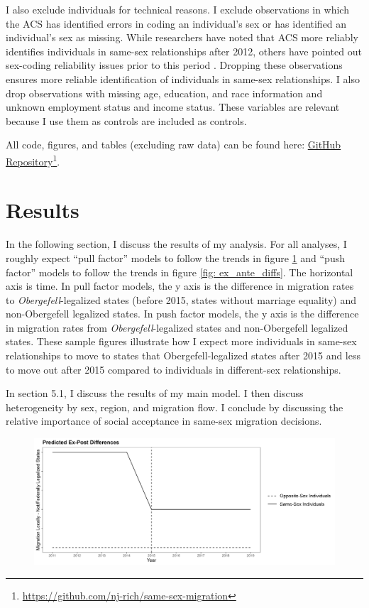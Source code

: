 \documentclass[12pt,letterpaper]{article}
\begin{document}
I also exclude individuals for technical reasons. I exclude observations in which the ACS has identified errors in coding an individual’s sex or has identified an individual’s sex as missing. While researchers have noted that ACS more reliably identifies individuals in same-sex relationships after 2012, others have pointed out sex-coding reliability issues prior to this period \citep{3, 5, 7, 12}. Dropping these observations ensures more reliable identification of individuals in same-sex relationships. I also drop observations with missing age, education, and race information and unknown employment status and income status. These variables are relevant because I use them as controls are included as controls. 

All code, figures, and tables (excluding raw data) can be found here: \href{https://github.com/nj-rich/same-sex-migration}{GitHub Repository}\footnote{\url{https://github.com/nj-rich/same-sex-migration}}.

\FloatBarrier
\section{Results}
In the following section, I discuss the results of my analysis. For all analyses, I roughly expect “pull factor” models to follow the trends in figure \ref{fig: ex_post_diffs} and “push factor” models to follow the trends in figure \ref{fig: ex_ante_diffs}. The horizontal axis is time. In pull factor models, the y axis is the difference in migration rates to \textit{Obergefell}-legalized states (before 2015, states without marriage equality) and non-Obergefell legalized states. In push factor models, the y axis is the difference in migration rates from \textit{Obergefell}-legalized states and non-Obergefell legalized states. These sample figures illustrate how I expect more individuals in same-sex relationships to move to states that Obergefell-legalized states after 2015 and less to move out after 2015 compared to individuals in different-sex relationships.

In section 5.1, I discuss the results of my main model. I then discuss heterogeneity by sex, region, and migration flow. I conclude by discussing the relative importance of social acceptance in same-sex migration decisions.

\begin{figure}[htbp]
    \includegraphics[width=0.75\linewidth]{outputs/summary_stats/ex_post_diffs.png}
    \centering
    \caption{}
    \label{fig: ex_post_diffs}
\end{figure}
\end{document}
